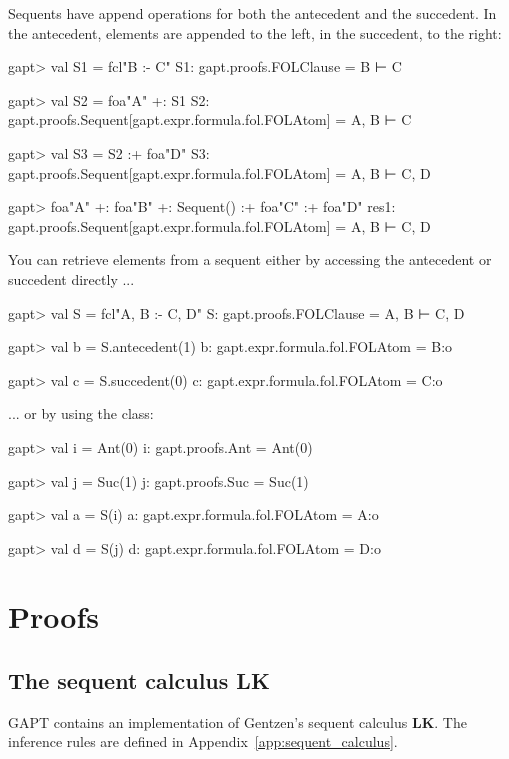 \documentclass[a4paper,11pt]{book}
\newcommand{\LK}{\textbf{LK}}
\newcommand{\cli}[1]{{\ttfamily {#1}}}
\begin{document}
Sequents have append operations for both the antecedent and the succedent. In the antecedent,
elements are appended to the left, in the succedent, to the right:

\begin{clilisting}
gapt> val S1 = fcl"B :- C"
S1: gapt.proofs.FOLClause = B ⊢ C

gapt> val S2 = foa"A" +: S1
S2: gapt.proofs.Sequent[gapt.expr.formula.fol.FOLAtom] = A, B ⊢ C

gapt> val S3 = S2 :+ foa"D"
S3: gapt.proofs.Sequent[gapt.expr.formula.fol.FOLAtom] = A, B ⊢ C, D

gapt> foa"A" +: foa"B" +: Sequent() :+ foa"C" :+ foa"D"
res1: gapt.proofs.Sequent[gapt.expr.formula.fol.FOLAtom] = A, B ⊢ C, D

\end{clilisting}

You can retrieve elements from a sequent either by accessing the antecedent
or succedent directly ...
\begin{clilisting}
gapt> val S = fcl"A, B :- C, D"
S: gapt.proofs.FOLClause = A, B ⊢ C, D

gapt> val b = S.antecedent(1)
b: gapt.expr.formula.fol.FOLAtom = B:o

gapt> val c = S.succedent(0)
c: gapt.expr.formula.fol.FOLAtom = C:o

\end{clilisting}
... or by using the \cli{SequentIndex} class:

\begin{clilisting}
gapt> val i = Ant(0)
i: gapt.proofs.Ant = Ant(0)

gapt> val j = Suc(1)
j: gapt.proofs.Suc = Suc(1)

gapt> val a = S(i)
a: gapt.expr.formula.fol.FOLAtom = A:o

gapt> val d = S(j)
d: gapt.expr.formula.fol.FOLAtom = D:o

\end{clilisting}


\section{Proofs}\label{sec:entering_proofs}

\subsection{The sequent calculus LK}
GAPT contains an implementation of Gentzen's sequent calculus {\LK}.
The inference rules are defined in Appendix~\ref{app:sequent_calculus}.
\end{document}
